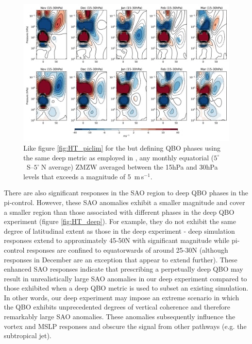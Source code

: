 \begin{figure}[h!]
\begin{center}
\noindent\includegraphics[width = \linewidth]{Figures/Figures-deepQBO/ZMZW_composites_by_month_QBO_phases_U_picontrol_MarQBO_vs_Mar_deep2hPa_5thresh.png}
\caption[]{Like figure \ref{fig:HT_piclim} for the but defining QBO phases using the same deep metric as employed in \cite{andrewsObserved2019d}, any monthly equatorial ($5^{\circ}$\ S--$5^{\circ}\ $N average) ZMZW averaged between the 15hPa and 30hPa levels that exceeds a magnitude of 5\ m\,s$^{-1}$.}
\label{fig:SLP_picontrol_deep}
\end{center}
\end{figure}

There are also significant responses in the SAO region to deep QBO phases in the pi-control. However, these SAO anomalies exhibit a smaller magnitude and cover a smaller region than those associated with different phases in the deep QBO experiment (figure \ref{fig:HT_deep}). For example, they do not exhibit the same degree of latitudinal extent as those in the deep experiment - deep simulation responses extend to approximately 45-50N with significant magnitude while pi-control responses are confined to equatorwards of around 25-30N (although responses in December are an exception that appear to extend further). These enhanced SAO responses indicate that prescribing a perpetually deep QBO may result in unrealistically large SAO anomalies in our deep experiment compared to those exhibited when a deep QBO metric is used to subset an existing simulation. In other words, our deep experiment may impose an extreme scenario in which the QBO exhibits unprecedented degrees of vertical coherence and therefore remarkably large SAO anomalies. These anomalies subsequently influence the vortex and MSLP responses and obscure the signal from other pathways (e.g. the subtropical jet).

